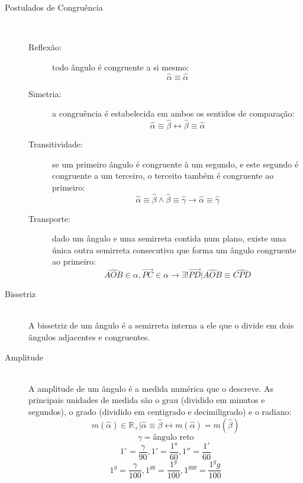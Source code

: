 \begin{description}
\begin{center}
                \end{center}
            \item[Postulados de Congruência] \hfill \\
                \begin{description}
                    \item[Reflexão:] todo ângulo é congruente a si mesmo:
                        \[ \hat{\alpha} \equiv \hat{\alpha} \]
                    \item[Simetria:] a congruência é estabelecida em ambos os sentidos de comparação:
                        \[ \hat{\alpha} \equiv \hat{\beta} \leftrightarrow \hat{\beta} \equiv \hat{\alpha} \]
                    \item[Transitividade:] se um primeiro ângulo é congruente à um segundo, e este segundo é congruente a um terceiro, o terceito também é congruente ao primeiro:
                        \[ \hat{\alpha} \equiv \hat{\beta} \wedge \hat{\beta} \equiv \hat{\gamma} \rightarrow \hat{\alpha} \equiv \hat{\gamma} \]
                    \item[Transporte:] dado um ângulo e uma semirreta contida num plano, existe uma única outra semirreta consecutiva que forma um ângulo congruente ao primeiro:
                        \[ \hat{AOB} \in \alpha , \overrightarrow{PC} \in \alpha \rightarrow \exists ! \overrightarrow{PD} | \hat{AOB} \equiv \hat{CPD} \]
                \end{description}
            \item[Bissetriz] \hfill \\
                A bissetriz de um ângulo é a semirreta interna a ele que o divide em dois ângulos adjacentes e congruentes.
            \item[Amplitude] \hfill \\
                A amplitude de um ângulo é a medida numérica que o descreve. As principais unidades de medida são o grau (dividido em minutos e segundos), o grado (dividido em centigrado e decimiligrado) e o radiano:
                \[ m(\hat{\alpha}) \in \mathbb{R}_{+} | \hat{\alpha} \equiv \hat{\beta} \leftrightarrow m(\hat{\alpha}) = m(\hat{\beta}) \]
                \[ \gamma = \text{ângulo reto} \]
                \[ 1^{\circ} = \frac{\gamma}{90}, 1' = \frac{1°}{60}, 1'' = \frac{1'}{60} \]
                \[ 1^g = \frac{\gamma}{100}, 1^{gg} = \frac{1^g}{100}, 1^{ggg} = \frac{1^gg}{100} \]

\end{description}
